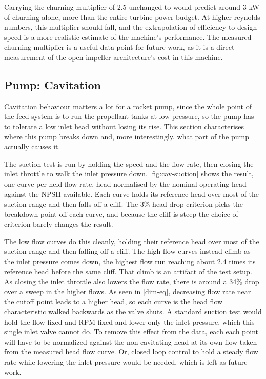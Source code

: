 Carrying the churning multiplier of 2.5 unchanged to \valPumpRpmDesign{} would predict around 3 kW of churning alone, more than the entire turbine power budget. At higher reynolds numbers, this multiplier should fall, and the extrapolation of efficiency to design speed is a more realistic estimate of the machine's performance. The measured churning multiplier is a useful data point for future work, as it is a direct measurement of the open impeller architecture's cost in this machine.

\subsection{Pump: Cavitation}

Cavitation behaviour matters a lot for a rocket pump, since the whole point of the feed system is to run the propellant tanks at low pressure, so the pump has to tolerate a low inlet head without losing its rise. This section characterises where this pump breaks down and, more interestingly, what part of the pump actually causes it.

The suction test is run by holding the speed and the flow rate, then closing the inlet throttle to walk the inlet pressure down. \cref{fig:cav-suction} shows the result, one curve per held flow rate, head normalised by the nominal operating head against the NPSH available. Each curve holds its reference head over most of the suction range and then falls off a cliff. The 3\% head drop criterion picks the breakdown point off each curve, and because the cliff is steep the choice of criterion barely changes the result. %

The low flow curves do this cleanly, holding their reference head over most of the suction range and then falling off a cliff. The high flow curves instead climb as the inlet pressure comes down, the highest flow run reaching about 2.4 times its reference head before the same cliff. That climb is an artifact of the test setup. As closing the inlet throttle also lowers the flow rate, there is around a 34\% drop over a sweep in the higher flows. As seen in \cref{dim-eq}, decreasing flow rate near the cutoff point leads to a higher head, so each curve is the head flow characteristic walked backwards as the valve shuts. A standard suction test would hold the flow fixed and RPM fixed and lower only the inlet pressure, which this single inlet valve cannot do. To remove this effect from the data, each each point will have to be normalized against the non cavitating head at its own flow taken from the measured head flow curve. Or, closed loop control to hold a steady flow rate while lowering the inlet pressure would be needed, which is left as future work.

